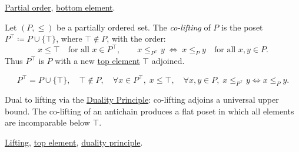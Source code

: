 \begin{remark*}[Dependencies]
\hyperref[def:partial-order]{Partial order},
\hyperref[def:bottom-element]{bottom element}.
\end{remark*}


\begin{definition}[Co-Lifting]
\label{def:co-lifting}
Let $(P, \leq)$ be a partially ordered set.  The \emph{co-lifting} of $P$
is the poset $P^{\top} \coloneqq P \cup \{\top\}$, where $\top \notin P$,
with the order:
\[
x \leq \top \quad \text{for all } x \in P^{\top},
\qquad
x \leq_{P^{\top}} y \;\Longleftrightarrow\; x \leq_P y
\quad \text{for all } x, y \in P.
\]
Thus $P^{\top}$ is $P$ with a new
\hyperref[def:top-element]{top element} $\top$ adjoined.
\end{definition}

\begin{remark*}
\[
P^{\top} = P \cup \{\top\},\quad
\top \notin P,\quad
\forall x \in P^{\top},\; x \leq \top,\quad
\forall x,y \in P,\; x \leq_{P^\top} y \Leftrightarrow x \leq_P y.
\]
\end{remark*}

\begin{remark*}[Interpretation]
Dual to lifting via the
\hyperref[prop:duality-principle]{Duality Principle}: co-lifting adjoins
a universal upper bound.  The co-lifting of an antichain produces a flat
poset in which all elements are incomparable below $\top$.
\end{remark*}

\begin{remark*}[Dependencies]
\hyperref[def:lifting]{Lifting},
\hyperref[def:top-element]{top element},
\hyperref[prop:duality-principle]{duality principle}.
\end{remark*}
